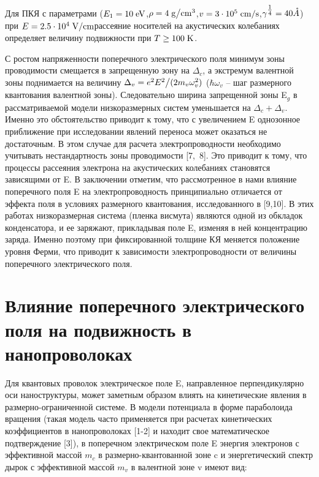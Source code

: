 Для ПКЯ с параметрами ($E_{1} =10{\rm \; eV}$,$\rho =4{\rm \; }{{\rm g} \mathord{\left/{\vphantom{{\rm g} {\rm cm}^{{\rm 3}} }}\right.\kern-\nulldelimiterspace} {\rm cm}^{{\rm 3}} } $,$v=3\cdot 10^{5} {\rm \; }{{\rm cm} \mathord{\left/{\vphantom{{\rm cm} {\rm s}}}\right.\kern-\nulldelimiterspace} {\rm s}} $,$\gamma ^{{\tfrac{1}{4}} } =40 \AA$) при $E=2.5\cdot 10^{4} {\rm \; V/cm}$рассеяние носителей на акустических колебаниях определяет величину подвижности при $T\ge 100{\rm \; K}$.

С ростом напряженности поперечного электрического поля минимум зоны проводимости смещается в запрещенную зону на $\Delta _{c} $, а экстремум валентной зоны поднимается на величину $\Delta _{v} ={e^{2} E^{2}  \mathord{\left/{\vphantom{e^{2} E^{2}  (2m_{v} }}\right.\kern-\nulldelimiterspace} (2m_{v} } \omega _{v}^{2} )$ ($\hbar \omega _{v} $ -- шаг размерного квантования валентной зоны). Следовательно ширина запрещенной зоны E${}_{g}$ в рассматриваемой модели низкоразмерных систем уменьшается на $\Delta _{c} +\Delta _{v} $. Именно это обстоятельство приводит к тому, что с увеличением E однозонное приближение при исследовании явлений переноса может оказаться не достаточным. В этом случае для расчета электропроводности необходимо учитывать нестандартность зоны проводимости [7,~8]. Это приводит к тому, что процессы рассеяния электрона на акустических колебаниях становятся зависящими от E. В заключении отметим, что рассмотренное в нами влияние поперечного поля E на электропроводность принципиально отличается от эффекта поля в условиях размерного квантования, исследованного в [9,10]. В этих работах низкоразмерная система (пленка висмута) являются одной из обкладок конденсатора, и ее заряжают, прикладывая поле E, изменяя в ней концентрацию заряда. Именно поэтому при фиксированной толщине КЯ меняется положение уровня Ферми, что приводит к зависимости электропроводности от величины поперечного электрического поля.

\section{Влияние поперечного электрического поля на подвижность в нанопроволоках} \label{sect4_2}

Для квантовых проволок электрическое поле E, направленное перпендикулярно оси наноструктуры, может заметным образом влиять на кинетические явления в размерно-ограниченной системе. В модели потенциала в форме параболоида вращения (такая модель часто применяется при расчетах кинетических коэффициентов в нанопроволоках [1-2] и находит свое математическое подтверждение [3]), в поперечном электрическом поле E энергия электронов с эффективной массой $m_{c} $ в размерно-квантованной зоне c и энергетический спектр дырок с эффективной массой $m_{v} $ в валентной зоне v имеют вид:

